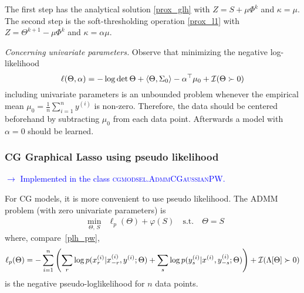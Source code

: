 \documentclass{article}
\newcommand{\loc}[1]{\textcolor{blue}{$\to$ #1}}
\newcommand{\bPr}[1]{\ensuremath{\left(#1 \right)}} %
\newcommand{\scalp}[1]{ \left\langle #1\right\rangle} %
\DeclareMathOperator{\logdet}{log\,det}
\DeclareMathOperator{\argmin}{arg\,min}
\begin{document}
The first step has the analytical solution \eqref{prox_glh} with $Z=S+\mu\Phi^k$ and $\kappa = \mu$.
The second step is the soft-thresholding operation \eqref{prox_l1} with $Z=\Theta^{k+1} - \mu\Phi^k$ and $\kappa = \alpha \mu$.
\medskip

\emph{Concerning univariate parameters.} 
Observe that minimizing the negative log-likelihood
\[\ell(\Theta, \alpha) = -\logdet \Theta + \scalp{\Theta, \Sigma_0} - \alpha^\top \mu_0 +\I( \Theta\succ0)\]
including univariate parameters is an unbounded problem whenever the empirical mean $\mu_0= \frac{1}{n}\sum_{i=1}^n y^{(i)}$ is non-zero. Therefore, the data should be centered beforehand by subtracting $\mu_0$ from each data point. Afterwards a model with $\alpha=0$ should be learned. 



\subsubsection{CG Graphical Lasso using pseudo likelihood}
\loc{Implemented in the class \textsc{cgmodsel.AdmmCGaussianPW}.}
 
For CG models, it is more convenient to use pseudo likelihood.
The ADMM problem (with zero univariate parameters) is
\begin{equation}
\begin{array}{lrlr}
&\underset{\Theta,\,S} {\min}& \ell_p(\Theta) + \varphi(S) \quad \textrm{s.t.} \quad\Theta = S
\end{array}
\end{equation}
where, compare~\eqref{plh_pw},
\[\ell_p(\Theta) = -\sum_{i=1}^n \bPr{\sum_r \log p(x_r^{(i)}|x_{-r}^{(i)}, y^{(i)};\Theta) + \sum_s \log p(y_s^{(i)}|x^{(i)}, y_{-s}^{(i)};\Theta) } + \I( \Lambda[\Theta]\succ0) \]
is the negative pseudo-loglikelihood for $n$ data points.
\medskip
\end{document}

